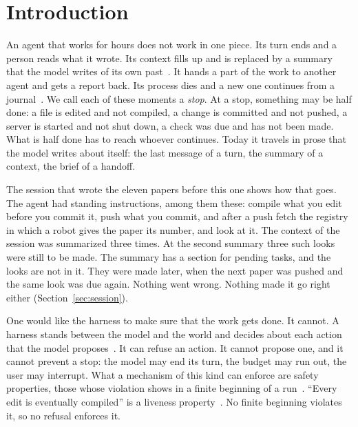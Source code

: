\documentclass[acmsmall,nonacm,screen]{acmart}
\begin{document}

\authorsaddresses{}

\maketitle

\section{Introduction}

An agent that works for hours does not work in one piece. Its turn ends and a person reads
what it wrote. Its context fills up and is replaced by a summary that the model writes of
its own past~\cite{anthropic2025context,packer2023}. It hands a part of the work to another
agent and gets a report back. Its process dies and a new one continues from a
journal~\cite{tpp8}. We call each of these moments a \emph{stop}. At a stop, something may be
half done: a file is edited and not compiled, a change is committed and not pushed, a server
is started and not shut down, a check was due and has not been made. What is half done has
to reach whoever continues. Today it travels in prose that the model writes about itself:
the last message of a turn, the summary of a context, the brief of a handoff.

The session that wrote the eleven papers before this one shows how that goes. The agent had
standing instructions, among them these: compile what you edit before you commit it, push
what you commit, and after a push fetch the registry in which a robot gives the paper its
number, and look at it. The context of the session was summarized three times. At the second
summary three such looks were still to be made. The summary has a section for pending
tasks, and the looks are not in it. They were made later, when the next paper was pushed
and the same look was due again. Nothing went wrong. Nothing made it go right either
(Section~\ref{sec:session}).

One would like the harness to make sure that the work gets done. It cannot. A harness
stands between the model and the world and decides about each action that the model
proposes~\cite{yao2023}. It can refuse an action. It cannot propose one, and it cannot
prevent a stop: the model may end its turn, the budget may run out, the user may interrupt.
What a mechanism of this kind can enforce are safety properties, those whose violation shows
in a finite beginning of a run~\cite{lamport1977,schneider2000}. ``Every edit is eventually
compiled'' is a liveness property~\cite{alpern1985}. No finite beginning violates it, so no
refusal enforces it.
\end{document}
